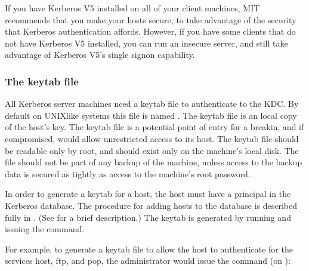 \documentclass[letterpaper,10pt,english]{sphinxmanual}
\begin{document}
\sphinxAtStartPar
If you have Kerberos V5 installed on all of your client machines, MIT
recommends that you make your hosts secure, to take advantage of the
security that Kerberos authentication affords.  However, if you have
some clients that do not have Kerberos V5 installed, you can run an
insecure server, and still take advantage of Kerberos V5’s single
sign\sphinxhyphen{}on capability.


\subsubsection{The keytab file}
\label{\detokenize{admin/install_appl_srv:the-keytab-file}}\label{\detokenize{admin/install_appl_srv:keytab-file}}
\sphinxAtStartPar
All Kerberos server machines need a keytab file to authenticate to the
KDC.  By default on UNIX\sphinxhyphen{}like systems this file is named {\hyperref[\detokenize{mitK5defaults:paths}]{}}.
The keytab file is an local copy of the host’s key.  The keytab file
is a potential point of entry for a break\sphinxhyphen{}in, and if compromised,
would allow unrestricted access to its host.  The keytab file should
be readable only by root, and should exist only on the machine’s local
disk.  The file should not be part of any backup of the machine,
unless access to the backup data is secured as tightly as access to
the machine’s root password.

\sphinxAtStartPar
In order to generate a keytab for a host, the host must have a
principal in the Kerberos database.  The procedure for adding hosts to
the database is described fully in {\hyperref[\detokenize{admin/database:principals}]{}}.  (See
{\hyperref[\detokenize{admin/install_kdc:replica-host-key}]{}} for a brief description.)  The keytab is
generated by running {\hyperref[\detokenize{admin/admin_commands/kadmin_local:kadmin-1}]{}} and issuing the {\hyperref[\detokenize{admin/admin_commands/kadmin_local:ktadd}]{}}
command.

\sphinxAtStartPar
For example, to generate a keytab file to allow the host
 to authenticate for the services host, ftp, and
pop, the administrator  would issue the command (on
):
\end{document}
